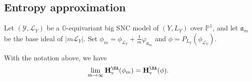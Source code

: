 \documentclass[11pt,a4paper]{article}
\begin{document}
\subsection{Entropy approximation}
\label{subsec:entropy-approximation}

Let $(\mathcal{Y},\mathcal{L}_Y)$ be a $\mathbb{G}$-equivariant big SNC model of $(Y,L_Y)$ over $\mathbb{P}^1$, and let $\mathfrak{a}_m$ be the base ideal of $|m\mathcal{L}_Y|$. Set $\phi_m = \phi_{\mathcal{L}_Y} + \frac{1}{m}\varphi_{\mathfrak{a}_m}$ and $\phi = P_{L_Y}(\phi_{\mathcal{L}_Y})$.

\begin{proposition}
    \label{prop:entropy_approximation}
    With the notation above, we have
    \begin{equation}\label{eq:prop:entropy_approximation_formula}
        \lim_{m\to\infty}\mathbf{H}^{\NA}_{\mathrm{v}}(\phi_m) = \mathbf{H}^{\NA}_{\mathrm{v}}(\phi).
    \end{equation}
\end{proposition}
\end{document}
